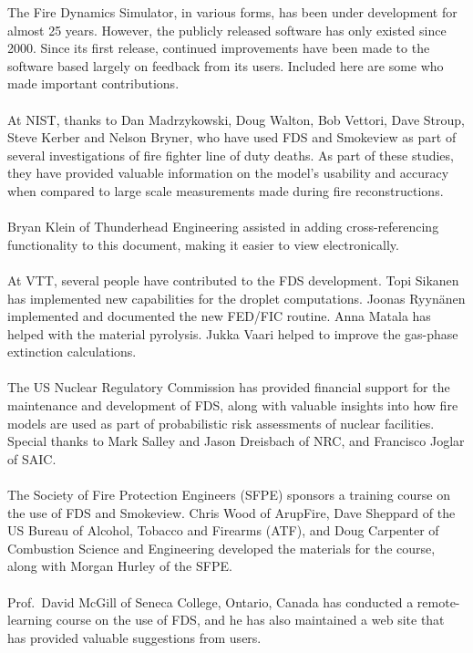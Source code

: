 \documentclass[11pt]{book}
\begin{document}
The Fire Dynamics Simulator, in various forms, has been under development for almost 25 years. However,
the publicly released software has only existed since 2000. Since its first release, continued improvements
have been made to the software based largely on feedback from its users.
Included here are some who made important contributions.\\
\\
\noindent At NIST, thanks to Dan Madrzykowski, Doug Walton, Bob Vettori, Dave Stroup, Steve Kerber and Nelson Bryner,
who have used FDS and Smokeview as part of several investigations of fire fighter line of duty deaths.
As part of these studies, they have provided valuable information on the model's usability and accuracy
when compared to large scale measurements made during fire reconstructions.\\
\\
\noindent Bryan Klein of Thunderhead Engineering assisted in adding cross-referencing functionality to this document, making it easier to
view electronically.\\
\\
\noindent At VTT, several people have contributed to the FDS development. Topi Sikanen has implemented new capabilities for
the droplet computations. Joonas Ryyn\"{a}nen implemented and documented the new FED/FIC routine. Anna Matala has helped with the
material pyrolysis. Jukka Vaari helped to improve the gas-phase extinction calculations.\\
\\
\noindent The US Nuclear Regulatory Commission has provided financial support for the maintenance and development of FDS,
along with valuable insights into how fire models are used as part of probabilistic risk assessments of nuclear
facilities. Special thanks to Mark Salley and Jason Dreisbach of NRC, and Francisco Joglar of SAIC.\\
\\
\noindent The Society of Fire Protection Engineers (SFPE) sponsors a training course on the use of FDS and Smokeview.
Chris Wood of ArupFire, Dave Sheppard of the US Bureau of Alcohol, Tobacco and Firearms (ATF), and
Doug Carpenter of Combustion Science and Engineering developed the materials for the course, along with
Morgan Hurley of the SFPE.\\
\\
\noindent Prof.~David McGill of Seneca College, Ontario, Canada has conducted a remote-learning course
on the use of FDS, and he has also maintained a web site that has provided valuable suggestions from users.\\
\end{document}

